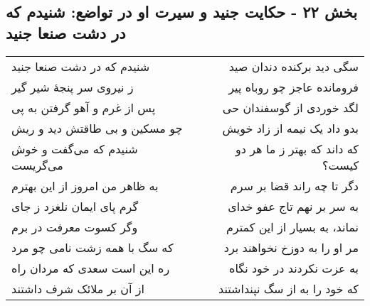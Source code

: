 \begin{center}
\section*{بخش ۲۲ - حکایت جنید و سیرت او در تواضع: شنیدم که در دشت صنعا جنید}
\label{sec:022}
\begin{longtable}{l p{0.5cm} r}
شنیدم که در دشت صنعا جنید
&&
سگی دید برکنده دندان صید
\\
ز نیروی سر پنجهٔ شیر گیر
&&
فرومانده عاجز چو روباه پیر
\\
پس از غرم و آهو گرفتن به پی
&&
لگد خوردی از گوسفندان حی
\\
چو مسکین و بی طاقتش دید و ریش
&&
بدو داد یک نیمه از زاد خویش
\\
شنیدم که می‌گفت و خوش می‌گریست
&&
که داند که بهتر ز ما هر دو کیست؟
\\
به ظاهر من امروز از این بهترم
&&
دگر تا چه راند قضا بر سرم
\\
گرم پای ایمان نلغزد ز جای
&&
به سر بر نهم تاج عفو خدای
\\
وگر کسوت معرفت در برم
&&
نماند، به بسیار از این کمترم
\\
که سگ با همه زشت نامی چو مرد
&&
مر او را به دوزخ نخواهند برد
\\
ره این است سعدی که مردان راه
&&
به عزت نکردند در خود نگاه
\\
از‍‍‍‍‍‍‍‍ آن بر ملائک شرف داشتند
&&
که خود را به از سگ نپنداشتند
\\
\end{longtable}
\end{center}
